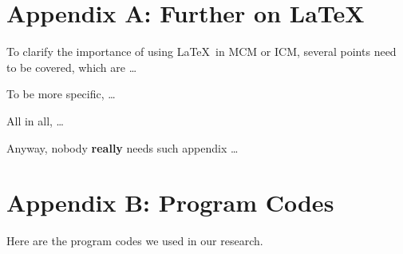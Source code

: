 \documentclass[12pt]{ctexart}
\begin{document}
\begin{subappendices}  %

  \section{Appendix A: Further on \LaTeX}
  To clarify the importance of using \LaTeX\ in MCM or ICM, several points need to be covered, which are \ldots

  To be more specific, \ldots

  All in all, \ldots

  Anyway, nobody \textbf{really} needs such appendix \ldots

  \section{Appendix B: Program Codes}
  Here are the program codes we used in our research.


  

  




\end{subappendices}  %
\end{document}
